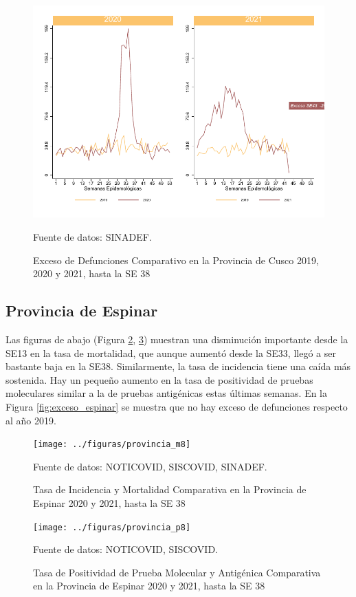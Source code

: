 \documentclass[12pt,a4paper,openany]{book}
\begin{document}
	\begin{figure}[h]
	\caption{Exceso de Defunciones Comparativo en la Provincia de Cusco 2019, 2020 y 2021, hasta la SE 38}\label{fig:exceso_cusco}
	\begin{center}
		\includegraphics[width=0.7\linewidth]{../figuras/exceso_7}
	\end{center}
	{\footnotesize {Fuente de datos: SINADEF.}}
	\end{figure}

\clearpage

	\subsection*{Provincia de Espinar}
	\noindent Las figuras de abajo (Figura \ref{fig:inc_mort_espinar}, \ref{fig:positividad_espinar})  muestran una disminución importante desde la SE13 en la tasa de mortalidad, que aunque aumentó desde la SE33, llegó a ser bastante baja en la SE38. Similarmente, la tasa de incidencia tiene una caída más sostenida. Hay un pequeño aumento en la tasa de positividad de pruebas moleculares similar a la de pruebas antigénicas estas últimas semanas. En la Figura \ref{fig:exceso_espinar} se muestra que no hay exceso de defunciones respecto al año 2019.

	\begin{figure}[h]
	\caption{Tasa de Incidencia y Mortalidad Comparativa en la Provincia de Espinar 2020 y 2021, hasta la SE 38}\label{fig:inc_mort_espinar}
	\begin{center}
		\texttt{[image: ../figuras/provincia\_m8]}
	\end{center}
	{\footnotesize {Fuente de datos: NOTICOVID, SISCOVID, SINADEF.}}
	\end{figure}

	\begin{figure}[h]
	\caption{Tasa de Positividad de Prueba Molecular y Antigénica Comparativa en la Provincia de Espinar 2020 y 2021, hasta la SE 38}\label{fig:positividad_espinar}
	\begin{center}
		\texttt{[image: ../figuras/provincia\_p8]}
	\end{center}
	{\footnotesize {Fuente de datos: NOTICOVID, SISCOVID.}}
	\end{figure}
\end{document}
